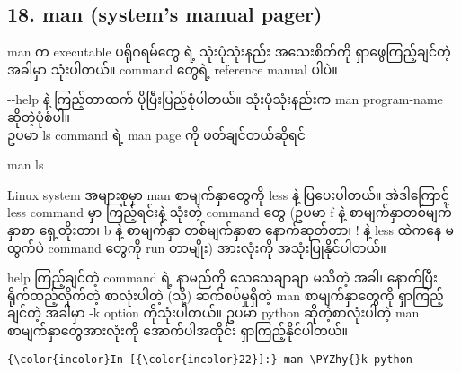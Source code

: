 \documentclass[11pt]{article}
\def\PYZhy{\char`\-}
\begin{document}
    \subsection{18. man (system's manual
pager)}\label{man-systems-manual-pager}

man က executable ပရိုဂရမ်တွေ ရဲ့ သုံးပုံသုံးနည်း အသေးစိတ်ကို
ရှာဖွေကြည့်ချင်တဲ့ အခါမှာ သုံးပါတယ်။ command တွေရဲ့ reference manual
ပါပဲ။

-\/-help နဲ့ ကြည့်တာထက် ပိုပြီးပြည့်စုံပါတယ်။ သုံးပုံသုံးနည်းက man
program-name ဆိုတဲ့ပုံစံပါ။\\
ဥပမာ ls command ရဲ့ man page ကို ဖတ်ချင်တယ်ဆိုရင်

man ls

Linux system အများစုမှာ man စာမျက်နှာတွေကို less နဲ့ ပြပေးပါတယ်။
အဲဒါကြောင့် less command မှာ ကြည့်ရင်းနဲ့ သုံးတဲ့ command တွေ (ဥပမာ f
နဲ့ စာမျက်နှာတစ်မျက်နှာစာ ရှေ့တိုးတာ၊ b နဲ့ စာမျက်နှာ တစ်မျက်နှာစာ
နောက်ဆုတ်တာ၊ ! နဲ့ less ထဲကနေ မထွက်ပဲ command တွေကို run တာမျိုး)
အားလုံးကို အသုံးပြုနိုင်ပါတယ်။

help ကြည့်ချင်တဲ့ command ရဲ့ နာမည်ကို သေသေချာချာ မသိတဲ့ အခါ၊ နောက်ပြီး
ရိုက်ထည့်လိုက်တဲ့ စာလုံးပါတဲ့ (သို့) ဆက်စပ်မှုရှိတဲ့ man စာမျက်နှာတွေကို
ရှာကြည့်ချင်တဲ့ အခါမှာ -k option ကိုသုံးပါတယ်။ ဥပမာ python
ဆိုတဲ့စာလုံးပါတဲ့ man စာမျက်နှာတွေအားလုံးကို အောက်ပါအတိုင်း
ရှာကြည့်နိုင်ပါတယ်။

    \begin{Verbatim}[commandchars=\\\{\}]
{\color{incolor}In [{\color{incolor}22}]:} man \PYZhy{}k python
\end{Verbatim}
\end{document}
